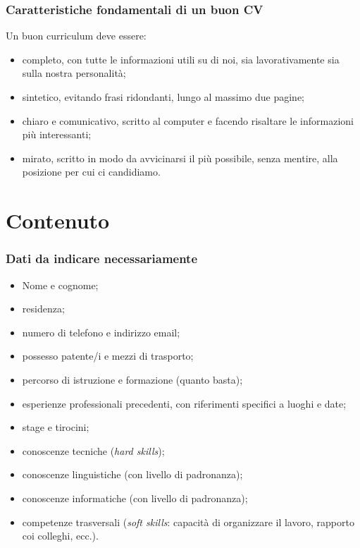 \documentclass[handout]{beamer}
\begin{document}
\begin{frame}
\frametitle{Caratteristiche fondamentali di un buon CV}
Un buon curriculum deve essere:
\begin{itemize}
  \item \alert{completo}, con tutte le informazioni utili su di noi, sia lavorativamente sia sulla nostra personalità;\pause
  \item \alert{sintetico}, evitando frasi ridondanti, lungo al massimo due pagine;\pause
  \item \alert{chiaro e comunicativo}, scritto al computer e facendo risaltare le informazioni più interessanti;\pause
  \item \alert{mirato}, scritto in modo da avvicinarsi il più possibile, senza mentire, alla posizione per cui ci candidiamo.
\end{itemize}
\end{frame}

\section{Contenuto}


\begin{frame}
\frametitle{Dati da indicare necessariamente}
\begin{itemize}
  \item Nome e cognome;\pause
  \item residenza;\pause
  \item numero di telefono e indirizzo email;\pause
  \item possesso patente/i e mezzi di trasporto;\pause
  \item percorso di istruzione e formazione (quanto basta);\pause
  \item esperienze professionali precedenti, con riferimenti specifici a luoghi e date;\pause
  \item stage e tirocini;\pause
  \item conoscenze tecniche (\emph{hard skills});\pause
  \item conoscenze linguistiche (con livello di padronanza);\pause
  \item conoscenze informatiche (con livello di padronanza);\pause
  \item competenze trasversali (\emph{soft skills}: capacità di organizzare il lavoro, rapporto coi colleghi, ecc.).
\end{itemize}
\end{frame}
\end{document}
